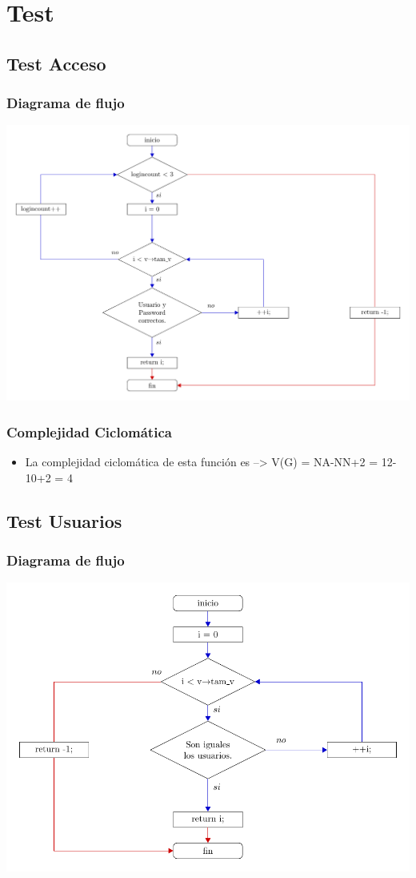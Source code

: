 \section{Test}
\subsection{Test Acceso}
\subsubsection{Diagrama de flujo}
\includegraphics[width=\textwidth, angle=0,scale=0.75]{dep/flujoacceso.pdf}
\subsubsection{Complejidad Ciclomática}
\begin{itemize}
\item La complejidad ciclomática de esta función es --> V(G) = NA-NN+2 = 12-10+2 = 4
\end{itemize}
\subsection{Test Usuarios}
\subsubsection{Diagrama de flujo}
\includegraphics[width=\textwidth, angle=0,scale=0.75]{dep/flujousuarios.pdf}

